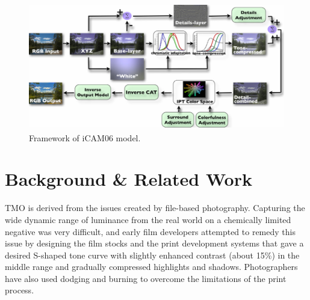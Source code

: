 \documentclass[10pt,twocolumn,letterpaper]{article}
\begin{document}
\newpage
\begin{figure}[!tp]
	\begin{center}
	\includegraphics[height=15em]{images/iCAM06_Framework.jpg}
	\end{center}
   	\caption{Framework of iCAM06 model.}
  	\label{iCAM06_Framework}
\end{figure}

\section{Background \& Related Work}
TMO is derived from the issues created by file-based photography. Capturing the wide dynamic range of luminance from the real world on a chemically limited negative was very difficult, and early film developers attempted to remedy this issue by designing the film stocks and the print development systems that gave a desired S-shaped tone curve with slightly enhanced contrast (about 15\%) in the middle range and gradually compressed highlights and shadows\cite{livingstone2002vision}. Photographers have also used dodging and burning to overcome the limitations of the print process\cite{hunt1987reproduction}.
\end{document}
